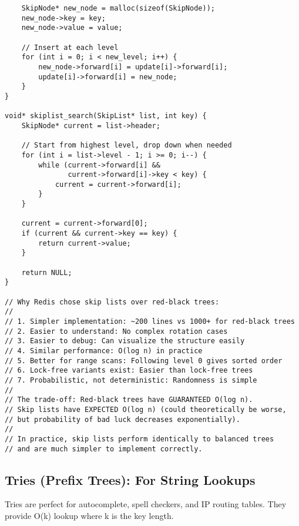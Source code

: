 \begin{lstlisting}
    SkipNode* new_node = malloc(sizeof(SkipNode));
    new_node->key = key;
    new_node->value = value;

    // Insert at each level
    for (int i = 0; i < new_level; i++) {
        new_node->forward[i] = update[i]->forward[i];
        update[i]->forward[i] = new_node;
    }
}

void* skiplist_search(SkipList* list, int key) {
    SkipNode* current = list->header;

    // Start from highest level, drop down when needed
    for (int i = list->level - 1; i >= 0; i--) {
        while (current->forward[i] &&
               current->forward[i]->key < key) {
            current = current->forward[i];
        }
    }

    current = current->forward[0];
    if (current && current->key == key) {
        return current->value;
    }

    return NULL;
}

// Why Redis chose skip lists over red-black trees:
//
// 1. Simpler implementation: ~200 lines vs 1000+ for red-black trees
// 2. Easier to understand: No complex rotation cases
// 3. Easier to debug: Can visualize the structure easily
// 4. Similar performance: O(log n) in practice
// 5. Better for range scans: Following level 0 gives sorted order
// 6. Lock-free variants exist: Easier than lock-free trees
// 7. Probabilistic, not deterministic: Randomness is simple
//
// The trade-off: Red-black trees have GUARANTEED O(log n).
// Skip lists have EXPECTED O(log n) (could theoretically be worse,
// but probability of bad luck decreases exponentially).
//
// In practice, skip lists perform identically to balanced trees
// and are much simpler to implement correctly.
\end{lstlisting}

\subsection{Tries (Prefix Trees): For String Lookups}

Tries are perfect for autocomplete, spell checkers, and IP routing tables. They provide O(k) lookup where k is the key length.

